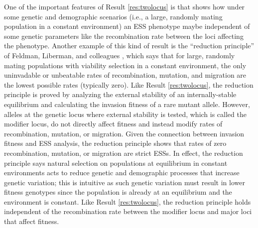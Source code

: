 \documentclass[11pt]{article}
\begin{document}
\begin{figure}[t!]
  \label{fig:pip:switching}
\end{figure}

One of the important features of Result \ref{res:twolocus} is that shows how under some genetic and demographic scenarios (i.e., a large, randomly mating population in a constant environment) an ESS phenotype maybe independent of some genetic parameters like the recombination rate between the loci affecting the phenotype. Another example of this kind of result is the ``reduction principle'' of Feldman, Liberman, and colleagues \cite{Feldman:Liberman:1986,Liberman:Feldman:1986,Liberman:Feldman:1986a,Liberman:Feldman:1989,Altenberg:Liberman:2017}, which says that for large, randomly mating populations with viability selection in a constant environment, the only uninvadable or unbeatable rates of recombination, mutation, and migration are the lowest possible rates (typically zero). Like Result \ref{res:twolocus}, the reduction principle is proved by analyzing the external stability of an internally-stable equilibrium and calculating the invasion fitness of a rare mutant allele. However, alleles at the genetic locus where external stability is tested, which is called the modifier locus, do not directly affect fitness and instead modify rates of recombination, mutation, or migration. Given the connection between invasion fitness and ESS analysis, the reduction principle shows that rates of zero recombination, mutation, or migration are strict ESSs. In effect, the reduction principle says natural selection on populations at equilibrium in constant environments acts to reduce genetic and demographic processes that increase genetic variation; this is intuitive as such genetic variation must result in lower fitness genotypes since the population is already at an equilibrium and the environment is constant. Like Result \ref{res:twolocus}, the reduction principle holds independent of the recombination rate between the modifier locus and major loci that affect fitness.
\end{document}
